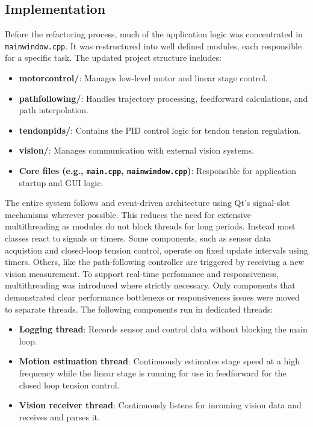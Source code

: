 \subsection{Implementation}
Before the refactoring process, much of the application logic was concentrated in \texttt{mainwindow.cpp}. It was restructured into well defined modules, each responsible for a specific task. The updated project structure includes:
\begin{itemize}
    \item \textbf{motorcontrol/}: Manages low-level motor and linear stage control.
    \item \textbf{pathfollowing/}: Handles trajectory processing, feedforward calculations, and path interpolation.
    \item \textbf{tendonpids/}: Contains the PID control logic for tendon tension regulation.
    \item \textbf{vision/}: Manages communication with external vision systems.
    \item \textbf{Core files (e.g., \texttt{main.cpp}, \texttt{mainwindow.cpp})}: Responsible for application startup and GUI logic.
\end{itemize}

The entire system follows and event-driven architecture using Qt's signal-slot mechanisms wherever possible. This reduces the need for extensive multithreading as modules do not block threads for long periods. Instead most classes react to signals or timers. Some components, such as sensor data acquistion and closed-loop tension control, operate on fixed update intervals using timers. Others, like the path-following controller are triggered by receiving a new vision measurement.
\newline \newline
To support real-time perfomance and responsiveness, multithreading was introduced where strictly necessary. Only components that demonstrated clear performance bottlenexs or responsiveness issues were moved to separate threads. The following components run in dedicated threads:
\begin{itemize}
    \item \textbf{Logging thread}: Records sensor and control data without blocking the main loop.
    \item \textbf{Motion estimation thread}: Continuously estimates stage speed at a high frequency while the linear stage is running for use in feedforward for the closed loop tension control.
    \item \textbf{Vision receiver thread}: Continuously listens for incoming vision data and receives and parses it.
\end{itemize}


